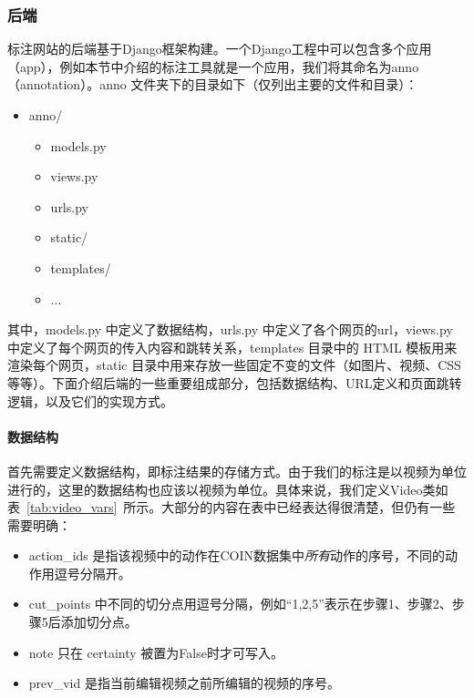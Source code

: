 \subsubsection{后端}
标注网站的后端基于Django\cite{django}框架构建。一个Django工程中可以包含多个应用（app），例如本节中介绍的标注工具就是一个应用，我们将其命名为anno（annotation）。anno 文件夹下的目录如下（仅列出主要的文件和目录）：
\begin{itemize}
    \item anno/
    \begin{itemize}
        \item models.py
        \item views.py
        \item urls.py
        \item static/
        \item templates/
        \item ...
    \end{itemize}
\end{itemize}
其中，models.py 中定义了数据结构，urls.py 中定义了各个网页的url，views.py 中定义了每个网页的传入内容和跳转关系，templates 目录中的 HTML 模板用来渲染每个网页，static 目录中用来存放一些固定不变的文件（如图片、视频、CSS 等等）。下面介绍后端的一些重要组成部分，包括数据结构、URL定义和页面跳转逻辑，以及它们的实现方式。

\paragraph{数据结构} 首先需要定义数据结构，即标注结果的存储方式。由于我们的标注是以视频为单位进行的，这里的数据结构也应该以视频为单位。具体来说，我们定义Video类如表~\ref{tab:video_vars}~所示。大部分的内容在表中已经表达得很清楚，但仍有一些需要明确：
\begin{itemize}
    \item action\_ids 是指该视频中的动作在COIN数据集中\emph{所有}动作的序号，不同的动作用逗号分隔开。
    \item cut\_points 中不同的切分点用逗号分隔，例如“1,2,5”表示在步骤1、步骤2、步骤5后添加切分点。
    \item note 只在 certainty 被置为False时才可写入。
    \item prev\_vid 是指当前编辑视频之前所编辑的视频的序号。
\end{itemize}

